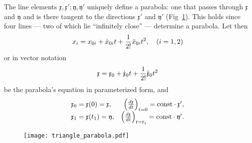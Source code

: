 \documentclass[11pt]{book} \usepackage{amssymb}
\newcommand{\myvec}[1]{\mathfrak{#1}}
\begin{document}
The line elements $\myvec{x},\myvec{x}';\myvec{y},\myvec{y}'$ uniquely define
a parabola: one that passes through  $\myvec{x}$ and $\myvec{y}$ and is there
tangent to the directions $\myvec{x}'$ and $\myvec{y}'$ 
(Fig~\ref{fig:triangle_parabola}). This holds since four lines --- two of
which lie ``infinitely close'' --- determine a parabola. Let then
\begin{equation}
  \label{eq:parabola_def1}
  x_i=x_{0i}+\dot{x}_{0i}t+{1\over 2!}\ddot{x}_{0i}t^2, \quad(i=1,2)
\end{equation}
or in vector notation
\begin{equation}
  \label{eq:parabola_def2}
  \myvec{x}=\myvec{x}_0+\dot{\myvec{x}}_0t+{1\over 2!}\ddot{\myvec{x}}_0t^2
\end{equation}
be the parabola's equation in parameterized form, and
\begin{equation}
  \label{eq:parabola_initial_def}
  \begin{array}{lrcl}
    \myvec{x}_0=\myvec{x}(0)=\myvec{x},& \left({d\myvec{x}\over dt}\right)_{t=0}=\mbox{const}\cdot \myvec{x}',\\
    \myvec{x}_1=\myvec{x}(t_1)=\myvec{y},& \left({d\myvec{x}\over dt}\right)_{t=t_1}=\mbox{const}\cdot \myvec{y}'.\\
  \end{array}  
\end{equation}

\begin{figure}[htp]
  \centering
  \texttt{[image: triangle\_parabola.pdf]}
  \caption{}
  \label{fig:triangle_parabola}
\end{figure}
\end{document}
